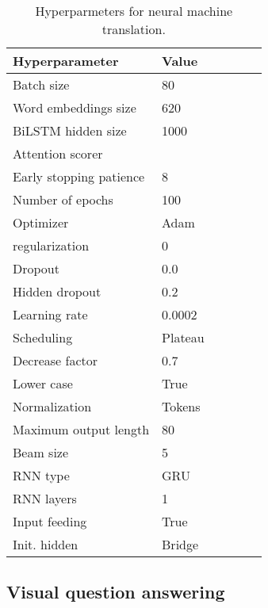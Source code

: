 \documentclass{article}
\begin{document}
\begin{table}[t]
    \caption{Hyperparmeters for neural machine translation.}
    \label{tab:table_all_hyperparams_nmt}
    \begin{small}
    \begin{center}
    \begin{tabular}{llllll}
        \toprule
        \sc Hyperparameter & \sc Value  \\
        \midrule
        Batch size                  & 80    \\
        Word embeddings size        & 620     \\
        BiLSTM hidden size          & 1000     \\
        Attention scorer            & \citep{bahdanau2014neural}     \\
        Early stopping patience & 8 \\
        Number of epochs            & 100     \\
        Optimizer                   & Adam      \\
         regularization     & 0     \\
        Dropout & 0.0 \\
        Hidden dropout & 0.2 \\
        Learning rate               & 0.0002     \\
        Scheduling & Plateau \\
        Decrease factor & 0.7 \\
        Lower case & True \\
        Normalization & Tokens \\
        Maximum output length & 80 \\
        Beam size & 5 \\
        RNN type & GRU \\
        RNN layers & 1 \\
        Input feeding & True \\
        Init. hidden & Bridge \\
        \bottomrule
    \end{tabular}
    \end{center}
    \end{small}
    \vskip -0.1in
\end{table}


\subsection{Visual question answering}
\end{document}
